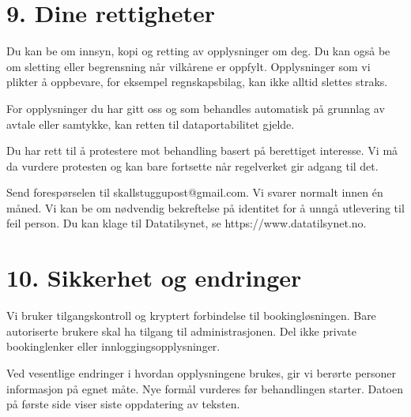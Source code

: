 \documentclass[12pt,a4paper]{article}
\begin{document}
\section{9. Dine rettigheter}
Du kan be om innsyn, kopi og retting av opplysninger om deg. Du kan også be om sletting eller begrensning når vilkårene er oppfylt. Opplysninger som vi plikter å oppbevare, for eksempel regnskapsbilag, kan ikke alltid slettes straks.

For opplysninger du har gitt oss og som behandles automatisk på grunnlag av avtale eller samtykke, kan retten til dataportabilitet gjelde.

Du har rett til å protestere mot behandling basert på berettiget interesse. Vi må da vurdere protesten og kan bare fortsette når regelverket gir adgang til det.

Send forespørselen til skallstuggupost@gmail.com. Vi svarer normalt innen én måned. Vi kan be om nødvendig bekreftelse på identitet for å unngå utlevering til feil person. Du kan klage til Datatilsynet, se https://www.datatilsynet.no.


\section{10. Sikkerhet og endringer}
Vi bruker tilgangskontroll og kryptert forbindelse til bookingløsningen. Bare autoriserte brukere skal ha tilgang til administrasjonen. Del ikke private bookinglenker eller innloggingsopplysninger.

Ved vesentlige endringer i hvordan opplysningene brukes, gir vi berørte personer informasjon på egnet måte. Nye formål vurderes før behandlingen starter. Datoen på første side viser siste oppdatering av teksten.
\end{document}
